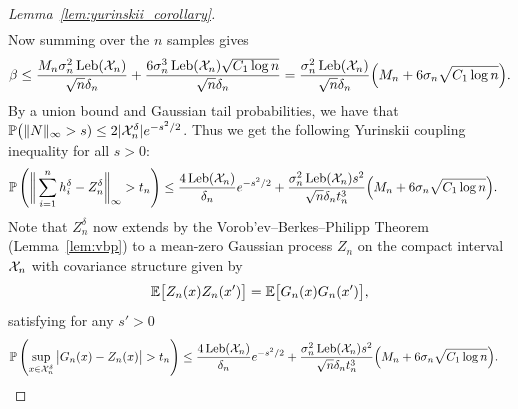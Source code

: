 \begin{proof}[Lemma~\ref{lem:yurinskii_corollary}]
\begin{align*}
  \end{align*}
  Now summing over the $n$ samples gives
  \begin{align*}
    \beta
    \leq
    \frac{M_n \sigma_n^2 \operatorname{Leb}(\mathcal{X}_n)}{\sqrt n \delta_n}
    + \frac{6\sigma_n^3 \operatorname{Leb}(\mathcal{X}_n) \sqrt{C_1 \log n}}
    {\sqrt n \delta_n}
    =
    \frac{\sigma_n^2 \operatorname{Leb}(\mathcal{X}_n)}{\sqrt n \delta_n}
    \Big(M_n + 6\sigma_n \sqrt{C_1 \log n}\Big).
  \end{align*}
  By a union bound
  and Gaussian tail probabilities,
  we have that
  $\mathbb{P}\big( \|N\|_\infty > s)
  \leq 2|\mathcal{X}_n^\delta| e^{-s^2/2}$.
  Thus we get the following Yurinskii coupling inequality
  for all $s > 0$:
  \begin{align*}
    \mathbb{P}\left(
      \bigg\|
      \sum_{i=1}^n
      h_i^\delta
      - Z_n^\delta
      \bigg\|_\infty
      > t_n
    \right)
    &\leq
    \frac{4 \operatorname{Leb}(\mathcal{X}_n)}{\delta_n}
    e^{-s^2/2}
    + \frac{\sigma_n^2 \operatorname{Leb}(\mathcal{X}_n) s^2}{\sqrt n \delta_n t_n^3}
    \Big(M_n + 6 \sigma_n \sqrt{C_1 \log n}\Big).
  \end{align*}
  Note that
  $Z_n^\delta$
  now extends
  by the Vorob'ev--Berkes--Philipp Theorem
  (Lemma~\ref{lem:vbp})
  to a mean-zero Gaussian
  process
  $Z_n$ on the compact interval $\mathcal{X}_n$
  with covariance structure given by
  \begin{align*}
    \mathbb{E}\big[
      Z_n(x)
      Z_n(x')
      \big]
    =
    \mathbb{E}\big[
      G_n(x)
      G_n(x')
      \big],
  \end{align*}
  satisfying for any $s' > 0$
  \begin{align*}
    \mathbb{P}\left(
      \sup_{x \in \mathcal{X}_n^\delta}
      \big|
      G_n(x) - Z_n(x)
      \big|
      > t_n
    \right)
    &\leq
    \frac{4 \operatorname{Leb}(\mathcal{X}_n)}{\delta_n}
    e^{-s^2/2}
    + \frac{\sigma_n^2 \operatorname{Leb}(\mathcal{X}_n) s^2}{\sqrt n \delta_n t_n^3}
    \Big(M_n + 6 \sigma_n \sqrt{C_1 \log n}\Big).
  \end{align*}



\end{proof}
